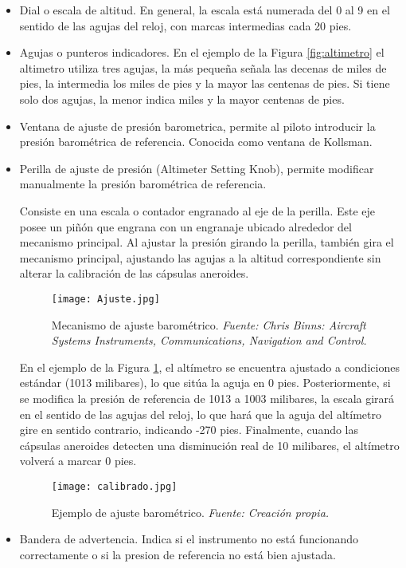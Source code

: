 \begin{itemize}
\item Dial o escala de altitud. En general, la escala está numerada del 0 al 9 en el sentido de las agujas del reloj, con marcas intermedias cada 20 pies.
\item Agujas o punteros indicadores. En el ejemplo de la Figura \ref{fig:altimetro} el altimetro utiliza tres agujas, la más pequeña señala las decenas de miles de pies, la intermedia los miles de pies y la mayor las centenas de pies. Si tiene solo dos agujas, la menor indica miles y la mayor centenas de pies. 
\item Ventana de ajuste de presión barometrica, permite al piloto introducir la presión barométrica de referencia. Conocida como ventana de Kollsman.
\item Perilla de ajuste de presión (Altimeter Setting Knob), permite modificar manualmente la presión barométrica de referencia.

Consiste en una escala o contador engranado al eje de la perilla. Este eje posee un piñón que engrana con un engranaje ubicado alrededor del mecanismo principal. Al ajustar la presión girando la perilla, también gira el mecanismo principal, ajustando las agujas a la altitud correspondiente sin alterar la calibración de las cápsulas aneroides.

\begin{figure}[H]
    \centering
    \texttt{[image: Ajuste.jpg]}
    \caption{\centering Mecanismo de ajuste barométrico. \textit{Fuente: Chris Binns: Aircraft Systems Instruments, Communications, Navigation and Control.}}
    \label{fig:yepea}
\end{figure}

En el ejemplo de la Figura \ref{fig:yepea}, el altímetro se encuentra ajustado a condiciones estándar (1013 milibares), lo que sitúa la aguja en 0 pies. Posteriormente, si se modifica la presión de referencia de 1013 a 1003 milibares, la escala girará en el sentido de las agujas del reloj, lo que hará que la aguja del altímetro gire en sentido contrario, indicando -270 pies. Finalmente, cuando las cápsulas aneroides detecten una disminución real de 10 milibares, el altímetro volverá a marcar 0 pies.

\begin{figure}[H]
    \centering
    \texttt{[image: calibrado.jpg]}
    \caption{\centering Ejemplo de ajuste barométrico. \textit{ Fuente: Creación propia.}}
    \label{fig:yoepea}
\end{figure}


\item Bandera de advertencia. Indica si el instrumento no está funcionando correctamente o si la presion de referencia no está bien ajustada.\\
\end{itemize}

